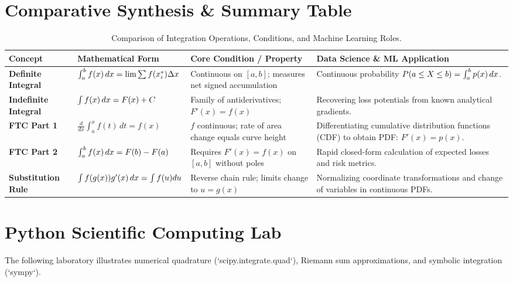 \section{Comparative Synthesis \& Summary Table}

\begin{table}[htbp]
\centering
\small
\begin{tabular}{p{2.6cm} p{3.2cm} p{3.8cm} p{4.2cm}}
\toprule
\textbf{Concept} & \textbf{Mathematical Form} & \textbf{Core Condition / Property} & \textbf{Data Science \& ML Application} \\
\midrule
\textbf{Definite Integral} & $\int_a^b f(x) \,dx = \lim \sum f(x_i^*) \Delta x$ & Continuous on $[a, b]$; measures net signed accumulation & Continuous probability $P(a \le X \le b) = \int_a^b p(x) \,dx$. \\
\addlinespace
\textbf{Indefinite Integral} & $\int f(x) \,dx = F(x) + C$ & Family of antiderivatives; $F'(x) = f(x)$ & Recovering loss potentials from known analytical gradients. \\
\addlinespace
\textbf{FTC Part 1} & $\frac{d}{dx} \int_a^x f(t) \, dt = f(x)$ & $f$ continuous; rate of area change equals curve height & Differentiating cumulative distribution functions (CDF) to obtain PDF: $F'(x) = p(x)$. \\
\addlinespace
\textbf{FTC Part 2} & $\int_a^b f(x) \,dx = F(b) - F(a)$ & Requires $F'(x) = f(x)$ on $[a, b]$ without poles & Rapid closed-form calculation of expected losses and risk metrics. \\
\addlinespace
\textbf{Substitution Rule} & $\int f(g(x))g'(x) \,dx = \int f(u) du$ & Reverse chain rule; limits change to $u = g(x)$ & Normalizing coordinate transformations and change of variables in continuous PDFs. \\
\bottomrule
\end{tabular}
\caption{Comparison of Integration Operations, Conditions, and Machine Learning Roles.}
\end{table}

\section{Python Scientific Computing Lab}

The following laboratory illustrates numerical quadrature (`scipy.integrate.quad`), Riemann sum approximations, and symbolic integration (`sympy`).

